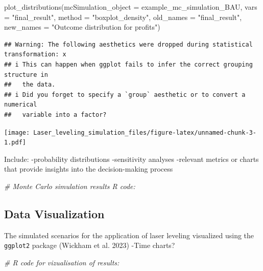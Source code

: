 \documentclass[
]{article}
\newenvironment{Shaded}{\begin{snugshade}}{\end{snugshade}}
\newcommand{\AttributeTok}[1]{\textcolor[rgb]{0.77,0.63,0.00}{#1}}
\newcommand{\CommentTok}[1]{\textcolor[rgb]{0.56,0.35,0.01}{\textit{#1}}}
\newcommand{\FunctionTok}[1]{\textcolor[rgb]{0.00,0.00,0.00}{#1}}
\newcommand{\NormalTok}[1]{#1}
\newcommand{\StringTok}[1]{\textcolor[rgb]{0.31,0.60,0.02}{#1}}
\begin{document}
\begin{Shaded}
\begin{Highlighting}[]
\FunctionTok{plot\_distributions}\NormalTok{(}\AttributeTok{mcSimulation\_object =}\NormalTok{ example\_mc\_simulation\_BAU,}
                   \AttributeTok{vars =} \StringTok{"final\_result"}\NormalTok{,}
                   \AttributeTok{method =} \StringTok{"boxplot\_density"}\NormalTok{,}
                   \AttributeTok{old\_names =} \StringTok{"final\_result"}\NormalTok{,}
                   \AttributeTok{new\_names =} \StringTok{"Outcome distribution for profits"}\NormalTok{)}
\end{Highlighting}
\end{Shaded}

\begin{verbatim}
## Warning: The following aesthetics were dropped during statistical transformation: x
## i This can happen when ggplot fails to infer the correct grouping structure in
##   the data.
## i Did you forget to specify a `group` aesthetic or to convert a numerical
##   variable into a factor?
\end{verbatim}

\texttt{[image: Laser\_leveling\_simulation\_files/figure-latex/unnamed-chunk-3-1.pdf]}

Include: -probability distributions -sensitivity analyses -relevant
metrics or charts that provide insights into the decision-making process

\begin{Shaded}
\begin{Highlighting}[]
\CommentTok{\# Monte Carlo simulation results R code:}
\end{Highlighting}
\end{Shaded}

\hypertarget{data-visualization}{%
\subsection{Data Visualization}\label{data-visualization}}

The simulated scenarios for the application of laser leveling visualized
using the \texttt{ggplot2} package (Wickham et al. 2023) -Time charts?

\begin{Shaded}
\begin{Highlighting}[]
\CommentTok{\# R code for vizualisation of results:}
\end{Highlighting}
\end{Shaded}
\end{document}

